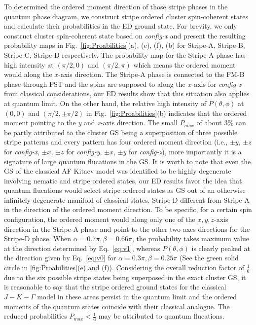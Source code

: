 \documentclass[aps,prb,reprint,amsfonts,amsmath,amssymb,showpacs,groupedaddress,superscriptaddress]{revtex4-1}
\begin{document}
To determined the ordered moment direction of those stripe phases in the quantum phase diagram, we construct stripe ordered cluster spin-coherent states and calculate their probabilities in the ED ground state. For brevity, we only construct cluster spin-coherent state based on \emph{config-x} and present the resulting probability maps in Fig.~\ref{fig:Proabilities}(a), (e), (f), (b) for Stripe-A, Stripe-B, Stripe-C, Stripe-D respectively. The probability map for the Stripe-A phase has high intensity at $(\pi/2, 0)$ and $(\pi/2, \pi)$ which means the ordered moment would along the $x$-axis direction. The Stripe-A phase is connected to the FM-B phase through FST and the spins are supposed to along the $x$-axis for \emph{config-x} from classical considerations, our ED results show that this situation also applies at quantum limit. On the other hand, the relative high intensity of $P(\theta, \phi)$ at $(0, 0)$ and $(\pi/2, \pm\pi/2)$ in Fig.~\ref{fig:Proabilities}(b) indicates that the ordered moment pointing to the $y$ and $z$-axis direction. The small $P_{max}$ of about 3\% can be partly attributed to the cluster GS being a superposition of three possible stripe patterns and every pattern has four ordered moment direction (i.e., $\pm y$, $\pm z$ for \emph{config-x}, $\pm x$, $\pm z$ for \emph{config-y}, $\pm x$, $\pm y$ for \emph{config-z}), more importantly it is a signature of large quantum flucations in the GS. It is worth to note that even the GS of the classical AF Kitaev model was identified to be highly degenerate involving nematic and stripe ordered states, our ED results favor the idea that quantum flucations would select stripe ordered states as GS out of an otherwise infinitely degenerate manifold of classical states. Stripe-D different from Stripe-A in the direction of the ordered moment direction. To be specific, for a certain spin configuration, the ordered moment would along only one of the $x, y, z$-axis direction in the Stripe-A phase and point to the other two axes directions for the Stripe-D phase. When $\alpha=0.7\pi,\beta=0.66\pi$, the probability takes maximum value at the direction determined by Eq.~\eqref{eq:v1}, whereas $P(\theta, \phi)$ is clearly peaked at the direction given by Eq.~\eqref{eq:v0} for $\alpha=0.3\pi, \beta=0.25\pi$ (See the green solid circle in \ref{fig:Proabilities}(e) and (f)). Considering the overall reduction factor of $\frac{1}{6}$ due to the six possible stripe states being superposed in the exact cluster GS, it is reasonable to say that the stripe ordered ground states for the classical $J-K-\Gamma$ model in these areas persist in the quantum limit and the ordered moments of the quantum states coincide with their classical analogue. The reduced probabilities $P_{max} < \frac{1}{6}$ may be attributed to quantum flucations.
\end{document}
